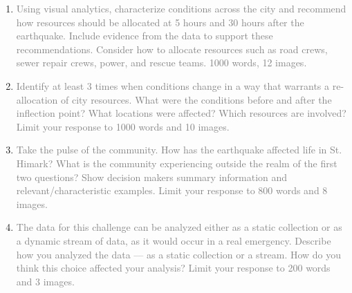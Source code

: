 \documentclass{article}
\begin{document}
\begin{enumerate}
    \item \textcolor{gray}{Using  visual analytics, characterize conditions
        across the city and recommend how resources should be allocated at 5
        hours and 30 hours after the earthquake. Include evidence from the data
        to support these recommendations. Consider how to allocate resources
        such as road crews, sewer repair crews, power, and rescue teams. 1000
        words, 12 images.}

    
    \newpage

    \item \textcolor{gray}{Identify at least 3 times when conditions change in
        a way that warrants a re-allocation of city resources. What were the
        conditions before and after the inflection point? What locations were
        affected? Which resources are involved? Limit your response to 1000
        words and 10 images.}

    

    \item \textcolor{gray}{Take the pulse of the community.  How has the
        earthquake affected life in St. Himark? What is the community
        experiencing outside the realm of the first two questions? Show decision
        makers summary information and relevant/characteristic examples. Limit
        your response to 800 words and 8 images.}

    

    \item \textcolor{gray}{The data for this challenge can be analyzed either as
        a static collection or as a dynamic stream of data, as it would occur in
        a real emergency. Describe how you analyzed the data --- as a static
        collection or a stream. How do you think this choice affected your
        analysis? Limit your response to 200 words and 3 images.}

    
\end{enumerate}
\end{document}
